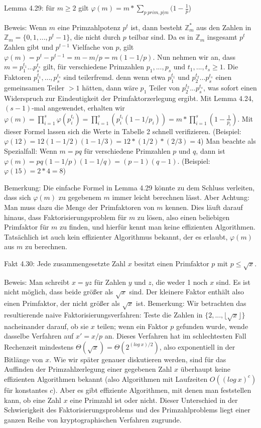 \documentclass[a4paper]{article}
\begin{document}
\begin{multicols}{3}
    Lemma 4.29: für $m\geq 2$ gilt $\varphi(m)=m*\sum_{p\ prim, p|m} (1-\frac{1}{p}$)

        Beweis: Wenn $m$ eine Primzahlpotenz $p^t$ ist, dann besteht $\mathbb{Z}^*_m$ aus den Zahlen in $\mathbb{Z}_m=\{0,1,...,p^t-1\}$, die nicht durch $p$ teilbar sind. Da es in $\mathbb{Z}_m$ insgesamt $p^t$ Zahlen gibt und $p^{t-1}$ Vielfache von $p$, gilt $\varphi(m)=p^t-p^{t-1} =m-m/p=m(1-1/p)$. Nun nehmen wir an, dass $m=p^{t_1}_1 ...p^{t_s}_s$ gilt, für verschiedene Primzahlen $p_1,...,p_s$ und $t_1,...,t_s\geq 1$. Die Faktoren $p^{t_1}_1,...,p^{t_s}_s$ sind teilerfremd. denn wenn etwa $p^{t_1}_1$ und $p^{t_2}_2...p^{t_s}_s$ einen gemeinsamen Teiler $>1$ hätten, dann wäre $p_1$ Teiler von $p^{t_2}_2...p^{t_s}_s$, was sofort einen Widerspruch zur Eindeutigkeit der Primfaktorzerlegung ergibt. Mit Lemma 4.24, $(s-1)$-mal angewendet, erhalten wir $\varphi(m) =\prod^s_{i=1} \varphi(p^{t_i}_i) = \prod^s_{i=1} (p^{t_i}_i (1-1/p_i)) =m* \prod^s_{i=1} (1-\frac{1}{p_i})$.
        Mit dieser Formel lassen sich die Werte in Tabelle 2 schnell verifizieren. (Beispiel: $\varphi(12) = 12(1-1/2)(1-1/3) = 12*(1/2)*(2/3) = 4$) Man beachte als Spezialfall: Wenn $m=pq$ für verschiedene Primzahlen $p$ und $q$, dann ist $\varphi(m)=pq(1-1/p)(1-1/q) =(p-1)(q-1)$. (Beispiel: $\varphi(15) =2*4=8$)

        Bemerkung: Die einfache Formel in Lemma 4.29 könnte zu dem Schluss verleiten, dass sich $\varphi(m)$ zu gegebenem $m$ immer leicht berechnen lässt. Aber Achtung: Man muss dazu die Menge der Primfaktoren von $m$ kennen. Dies läuft darauf hinaus, dass Faktorisierungsproblem für $m$ zu lösen, also einen beliebigen Primfaktor für $m$ zu finden, und hierfür kennt man keine effizienten Algorithmen. Tatsächlich ist auch
        kein effizienter Algorithmus bekannt, der es erlaubt, $\varphi(m)$ aus $m$ zu berechnen.

        Fakt 4.30: Jede zusammengesetzte Zahl $x$ besitzt einen Primfaktor $p$ mit $p\leq\sqrt{x}$.

        Beweis: Man schreibt $x=yz$ für Zahlen $y$ und $z$, die weder 1 noch $x$ sind. Es ist nicht möglich, dass beide größer als $\sqrt{x}$ sind. Der kleinere Faktor enthält also einen Primfaktor, der nicht größer als $\sqrt{x}$ ist.
        Bemerkung: Wir betrachten das resultierende naive Faktorisierungsverfahren: Teste die Zahlen in $\{2,...,\lfloor\sqrt{x}\rfloor\}$ nacheinander darauf, ob sie $x$ teilen; wenn ein Faktor $p$ gefunden wurde, wende dasselbe Verfahren auf $x'=x/p$ an. Dieses Verfahren hat im schlechtesten Fall Rechenzeit mindestens $\Theta (\sqrt{x}) = \Theta (2^{(log\ x)/ 2})$, also exponentiell in der Bitlänge von $x$. Wie wir später genauer diskutieren werden, sind für das Auffinden der Primzahlzerlegung einer gegebenen Zahl $x$ überhaupt keine effizienten Algorithmen bekannt (also Algorithmen mit Laufzeiten $O((log\ x)^c)$ für konstantes $c$). Aber es gibt effiziente Algorithmen, mit denen man feststellen kann, ob eine Zahl $x$ eine Primzahl ist oder nicht. Dieser Unterschied in der Schwierigkeit des Faktorisierungsproblems und des Primzahlproblems liegt einer ganzen Reihe von kryptographischen Verfahren zugrunde.


\end{multicols}
\end{document}
